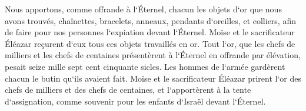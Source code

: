 \verse Nous apportons, comme offrande à l`Éternel, chacun les objets d`or que nous avons trouvés, chaînettes, bracelets, anneaux, pendants d`oreilles, et colliers, afin de faire pour nos personnes l`expiation devant l`Éternel. 
\verse Moïse et le sacrificateur Éléazar reçurent d`eux tous ces objets travaillés en or. 
\verse Tout l`or, que les chefs de milliers et les chefs de centaines présentèrent à l`Éternel en offrande par élévation, pesait seize mille sept cent cinquante sicles. 
\verse Les hommes de l`armée gardèrent chacun le butin qu`ils avaient fait. 
\verse Moïse et le sacrificateur Éléazar prirent l`or des chefs de milliers et des chefs de centaines, et l`apportèrent à la tente d`assignation, comme souvenir pour les enfants d`Israël devant l`Éternel. 

